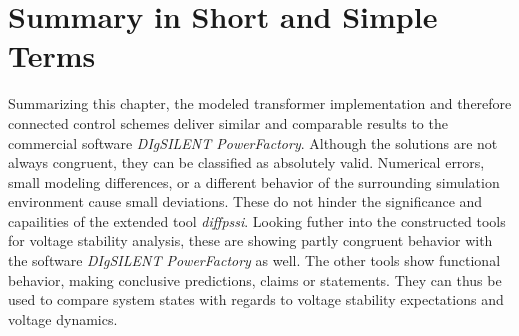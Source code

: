 \section{Summary in Short and Simple Terms}

Summarizing this chapter, the modeled transformer implementation and therefore connected control schemes deliver similar and comparable results to the commercial software \textit{DIgSILENT PowerFactory}.
Although the solutions are not always congruent, they can be classified as absolutely valid.
Numerical errors, small modeling differences, or a different behavior of the surrounding simulation environment cause small deviations.
These do not hinder the significance and capailities of the extended tool \textit{diffpssi}.
Looking futher into the constructed tools for voltage stability analysis, these are showing partly congruent behavior with the software \textit{DIgSILENT PowerFactory} as well.
The other tools show functional behavior, making conclusive predictions, claims or statements.
They can thus be used to compare system states with regards to voltage stability expectations and voltage dynamics.